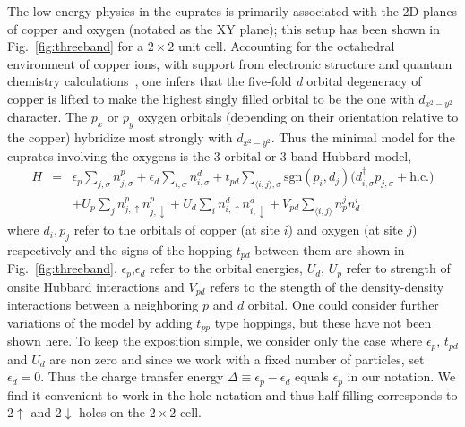 The low energy physics in the cuprates is primarily associated with the 2D planes of copper and oxygen (notated 
as the XY plane); this setup has been shown in Fig.~\ref{fig:threeband} for a $2 \times 2$ unit cell.
Accounting for the octahedral environment of copper ions, with support from electronic structure 
and quantum chemistry calculations~\cite{Dagotto_RevModPhys}, one infers 
that the five-fold \emph{d} orbital degeneracy of copper is lifted to make the 
highest singly filled orbital to be the one with $d_{x^2-y^2}$ character. 
The $p_x$ or $p_y$ oxygen orbitals (depending on their orientation relative to the copper) 
hybridize most strongly with $d_{x^2-y^2}$. Thus the minimal model for the cuprates involving the oxygens 
is the 3-orbital or 3-band Hubbard model, 
\begin{eqnarray}
H &=&    \epsilon_p \sum_{j,\sigma} n^{p}_{j,\sigma} + \epsilon_{d} \sum_{i,\sigma}  n^{d}_{i,\sigma} 
	+ t_{pd} \sum_{\langle i,j \rangle, \sigma} \text{sgn}(p_i,d_j) \Big( d_{i,\sigma}^{\dagger} p_{j,\sigma} + \text{h.c.} \Big) \nonumber \\
  & &   + U_p \sum_{j} n^{p}_{j,\uparrow} n^{p}_{j,\downarrow} + U_d \sum_{i} n^{d}_{i,\uparrow} n^{d}_{i,\downarrow} + V_{pd} \sum_{\langle i,j \rangle} n^{j}_p n^{i}_d 
\end{eqnarray}
where $d_i,p_j$ refer to the orbitals of copper (at site $i$) and oxygen (at site $j$)  respectively 
and the signs of the hopping $t_{pd}$ between them are shown in Fig.~\ref{fig:threeband}. 
$\epsilon_p$,$\epsilon_d$ refer to the orbital energies, 
$U_d$, $U_p$ refer to strength of onsite Hubbard interactions and $V_{pd}$ refers to the 
stength of the density-density interactions between a neighboring $p$ and $d$ orbital. 
One could consider further variations of the model by adding $t_{pp}$ type hoppings, but 
these have not been shown here. To keep the exposition simple, we consider only 
the case where $\epsilon_p$, $t_{pd}$ and $U_{d}$ are non zero and 
since we work with a fixed number of particles, set $\epsilon_d = 0$. Thus the 
charge transfer energy $\Delta \equiv \epsilon_p - \epsilon_d$ equals $\epsilon_p$ in our notation. 
We find it convenient to work in the hole notation and thus half filling corresponds to 2$\uparrow$ and 2$\downarrow$ 
holes on the $2\times2$ cell.

